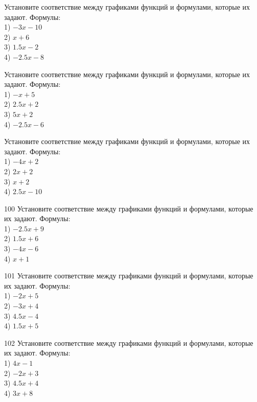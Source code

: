 \documentclass[4apaper]{article}
\begin{document}
\begin{taskBN}{97}
Установите соответствие между графиками функций и формулами, которые их задают. Формулы: \\1) $-3x-10$\\2) $x+6$\\3) $1.5x-2$\\4) $-2.5x-8$
\end{taskBN}

\begin{taskBN}{98}
Установите соответствие между графиками функций и формулами, которые их задают. Формулы: \\1) $-x+5$\\2) $2.5x+2$\\3) $5x+2$\\4) $-2.5x-6$
\end{taskBN}

\begin{taskBN}{99}
Установите соответствие между графиками функций и формулами, которые их задают. Формулы: \\1) $-4x+2$\\2) $2x+2$\\3) $x+2$\\4) $2.5x-10$
\end{taskBN}

\begin{taskBN}{100}
Установите соответствие между графиками функций и формулами, которые их задают. Формулы: \\1) $-2.5x+9$\\2) $1.5x+6$\\3) $-4x-6$\\4) $x+1$
\end{taskBN}

\begin{taskBN}{101}
Установите соответствие между графиками функций и формулами, которые их задают. Формулы: \\1) $-2x+5$\\2) $-3x+4$\\3) $4.5x-4$\\4) $1.5x+5$
\end{taskBN}

\begin{taskBN}{102}
Установите соответствие между графиками функций и формулами, которые их задают. Формулы: \\1) $4x-1$\\2) $-2x+3$\\3) $4.5x+4$\\4) $3x+8$
\end{taskBN}
\end{document}
